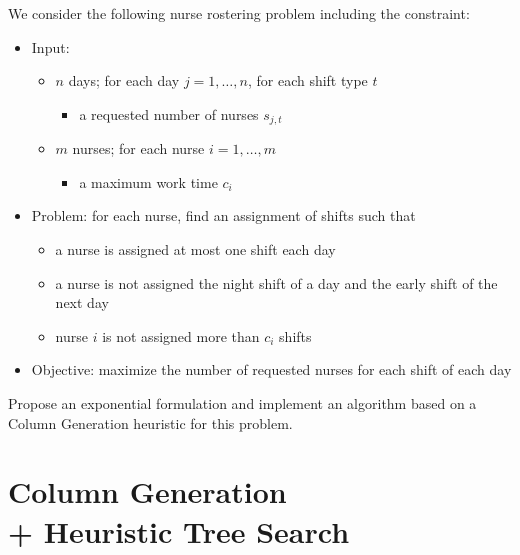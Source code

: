 \documentclass[a4paper,twocolumn]{article}
\begin{document}
We consider the following nurse rostering problem including the constraint:
\begin{itemize}
  \item Input:
    \begin{itemize}
      \item $n$ days; for each day $j = 1, \dots, n$, for each shift type $t$
        \begin{itemize}
          \item a requested number of nurses $s_{j, t}$
        \end{itemize}
      \item $m$ nurses; for each nurse $i = 1, \dots, m$
        \begin{itemize}
          \item a maximum work time $c_i$
        \end{itemize}
    \end{itemize}
  \item Problem: for each nurse, find an assignment of shifts such that
    \begin{itemize}
      \item a nurse is assigned at most one shift each day
      \item a nurse is not assigned the night shift of a day and the early shift of the next day
      \item nurse $i$ is not assigned more than $c_i$ shifts
    \end{itemize}
  \item Objective: maximize the number of requested nurses for each shift of each day
\end{itemize}

Propose an exponential formulation and implement an algorithm based on a Column Generation heuristic for this problem.

\section{Column Generation \\ + Heuristic Tree Search}
\end{document}
